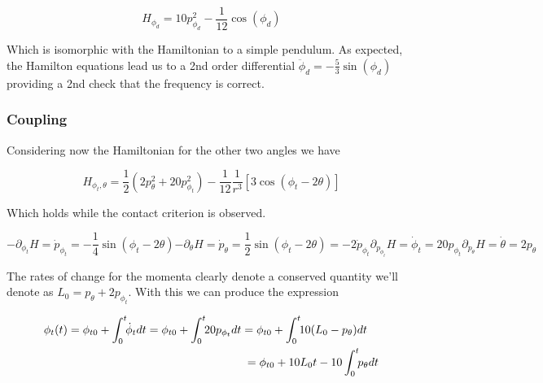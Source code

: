 \documentclass[prbg,preprint]{revtex4-1}
\begin{document}
\begin{equation}
	H_{\phi_d}=
	10 p_{\phi_d}^2 
	-
	\frac{1}{12}
        \cos(\phi_d)
\end{equation}

Which is isomorphic with the Hamiltonian to a simple pendulum. As expected, the Hamilton equations lead us to  a 2nd order differential $\ddot \phi_d = - \frac{5}{3}\sin(\phi_d)$ providing a 2nd check that the frequency is correct.

\subsubsection{Coupling}

Considering now the Hamiltonian for the other two angles we have

\begin{equation}
	H_{\phi_t, \theta}=
	\frac{1}{2}\left (
	2 p_\theta^2
	+20 p_{\phi_t}^2 
        \right )
	-
	\frac{1}{12}
	\frac{1}{r^3}[
	        3\cos(\phi_t-2\theta)
	    ]
\end{equation}

Which holds while the contact criterion is observed.

\begin{subequations}
	\begin{equation}\label{f_phit}
		-\partial_{\phi_t}H= \dot p_{\phi_t} 
		= - \frac{1}{4} \sin{\left (\phi_{t} - 2 \theta \right )}
	\end{equation}
	\begin{equation}\label{f_tht}
		-\partial_{\theta}H= \dot p_{\theta}  
		= \frac{1}{2} \sin{\left (\phi_{t} - 2 \theta \right )}
		=-2\dot p_{\phi_t}
	\end{equation}
	\begin{equation}
		\partial_{p_{\phi_t}}H= \dot \phi_t 
		= 20 p_{\phi_t}
	\end{equation}
	\begin{equation}
		\partial_{p_{\theta}}H= \dot \theta 
		= 2 p_{\theta}
	\end{equation}
\end{subequations}

The rates of change for the momenta clearly denote a conserved quantity we'll denote as $L_0 = p_\theta + 2p_{\phi_t}$. With this we can produce the expression

\begin{equation}
  \begin{multlined}
	\phi_t(t) 
	= \phi_{t0} + \int_0^t \kern-.33em  \dot \phi_t  dt
	= \phi_{t0} + \int_0^t \kern-.33em 20 p_{ \phi_t } dt
	= \phi_{t0} + \int_0^t \kern-.33em 10 (L_0-p_{ \theta }) dt
	\\
	= \phi_{t0} + 10L_0t -10 \int_0^t \kern-.33em p_{ \theta } dt
  \end{multlined}
\end{equation}
\end{document}
